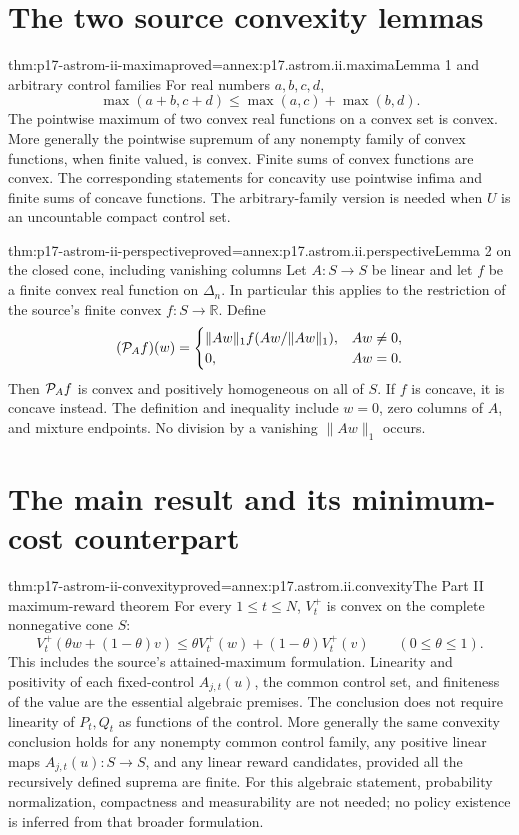 \section{The two source convexity lemmas}

\begin{hblemma}{thm:p17-astrom-ii-maxima}{proved=annex:p17.astrom.ii.maxima}{Lemma 1 and arbitrary control families}
For real numbers \(a,b,c,d\),
\[
             \max(a+b,c+d)\leq\max(a,c)+\max(b,d).
\]
The pointwise maximum of two convex real functions on
a convex set is convex.
More generally the pointwise supremum of any nonempty family
of convex functions, when finite valued, is convex.
Finite sums of convex functions are convex.
The corresponding statements for concavity use pointwise
infima and finite sums of concave functions.
The arbitrary-family version is needed when \(U\) is
an uncountable compact control set.
\end{hblemma}

\begin{hblemma}{thm:p17-astrom-ii-perspective}{proved=annex:p17.astrom.ii.perspective}{Lemma 2 on the closed cone, including vanishing columns}
Let \(A:S\to S\) be linear and let \(f\) be a finite
convex real function on \(\Delta_n\).
In particular this applies to the restriction of the
source's finite convex \(f:S\to\mathbb R\).
Define
\[
 ({\cal P}_A f)(w)=
 \begin{cases}
  \|Aw\|_1 f(Aw/\|Aw\|_1),&Aw\ne0,\\
  0,&Aw=0 .
 \end{cases}
\]
Then \({\cal P}_A f\) is convex and positively homogeneous
on all of \(S\). If \(f\) is concave, it is concave instead.
The definition and inequality include \(w=0\), zero columns
of \(A\), and mixture endpoints.
No division by a vanishing \(\|Aw\|_1\) occurs.
\end{hblemma}

\section{The main result and its minimum-cost counterpart}

\begin{hbtheorem}{thm:p17-astrom-ii-convexity}{proved=annex:p17.astrom.ii.convexity}{The Part II maximum-reward theorem}
For every \(1\leq t\leq N\), \(V_t^+\) is convex on
the complete nonnegative cone \(S\):
\[
 V_t^+(\theta w+(1-\theta)v)
          \leq\theta V_t^+(w)+(1-\theta)V_t^+(v)
                      \qquad(0\leq\theta\leq1).
\]
This includes the source's attained-maximum formulation.
Linearity and positivity of each fixed-control \(A_{j,t}(u)\),
the common control set, and finiteness of the value are the
essential algebraic premises. The conclusion does not require
linearity of \(P_t,Q_t\) as functions of the control.
More generally the same convexity conclusion holds for any
nonempty common control family, any positive linear maps
\(A_{j,t}(u):S\to S\), and any linear reward candidates,
provided all the recursively defined suprema are finite.
For this algebraic statement, probability normalization,
compactness and measurability are not needed; no policy
existence is inferred from that broader formulation.
\end{hbtheorem}

